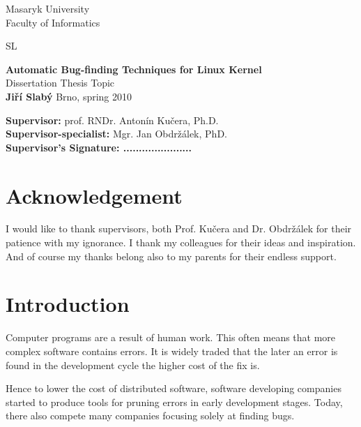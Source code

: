 \documentclass[11pt,a4paper]{article}
\begin{document}
\begin{titlepage}
\vspace{2cm}
\begin{center}
      {\sc Masaryk University\\Faculty of Informatics}

     \vspace{1cm}
     \logo SL

     \vspace{2cm}
     {\bf\huge Automatic Bug-finding Techniques for Linux Kernel}\\[0.8in]

     {\sc\large Dissertation Thesis Topic}\\[0.4in]

     {\Large\bf Jiří Slabý}
     \vfill
     {\large Brno, spring 2010}
     \vfill
\end{center}
     {\bf Supervisor:} prof. RNDr. Antonín Kučera, Ph.D.\\
     {\bf Supervisor-specialist:} Mgr. Jan Obdržálek, PhD.\\[1cm]
     {\bf Supervisor's Signature: ......................}
\end{titlepage}

\pagestyle{plain}

\null\vfill
\section*{Acknowledgement}
I would like to thank supervisors, both Prof. Kučera and Dr. Obdržálek for
their patience with my ignorance. I thank my colleagues for their ideas and
inspiration. And of course my thanks belong also to my parents for their
endless support.

\newpage

\tableofcontents

\newpage
{}

\section{Introduction}
Computer programs are a result of human work. This often means that more
complex software contains errors. It is widely traded that the later an error
is found in the development cycle the higher cost of the fix is.

Hence to lower the cost of distributed software, software developing companies
started to produce tools for pruning errors in early development stages.
Today, there also compete many companies focusing solely at finding bugs.
\end{document}
